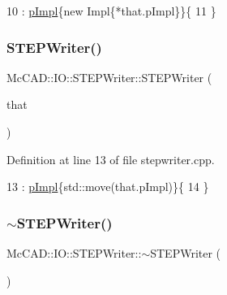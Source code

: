 \begin{DoxyCode}
10                                                     : \hyperlink{classMcCAD_1_1IO_1_1STEPWriter_af607286b2a18648c14ece6b8bc103db4}{pImpl}\{\textcolor{keyword}{new} Impl\{*that.pImpl\}\}\{
11 \}
\end{DoxyCode}
\mbox{\label{classMcCAD_1_1IO_1_1STEPWriter_a4afb3cf439afc5dced54779ccf323520}} 
\subsubsection{\texorpdfstring{S\+T\+E\+P\+Writer()}{STEPWriter()}\hspace{0.1cm}{\footnotesize\ttfamily [3/6]}}
{\footnotesize\ttfamily Mc\+C\+A\+D\+::\+I\+O\+::\+S\+T\+E\+P\+Writer\+::\+S\+T\+E\+P\+Writer (\begin{DoxyParamCaption}\item[{\hyperlink{classMcCAD_1_1IO_1_1STEPWriter}{S\+T\+E\+P\+Writer} \&\&}]{that }\end{DoxyParamCaption})}



Definition at line 13 of file stepwriter.\+cpp.


\begin{DoxyCode}
13                                                : \hyperlink{classMcCAD_1_1IO_1_1STEPWriter_af607286b2a18648c14ece6b8bc103db4}{pImpl}\{std::move(that.pImpl)\}\{
14 \}
\end{DoxyCode}
\mbox{\label{classMcCAD_1_1IO_1_1STEPWriter_a50066bad641148a65641ddb4ac21c07d}} 
\subsubsection{\texorpdfstring{$\sim$\+S\+T\+E\+P\+Writer()}{~STEPWriter()}\hspace{0.1cm}{\footnotesize\ttfamily [1/2]}}
{\footnotesize\ttfamily Mc\+C\+A\+D\+::\+I\+O\+::\+S\+T\+E\+P\+Writer\+::$\sim$\+S\+T\+E\+P\+Writer (\begin{DoxyParamCaption}{ }\end{DoxyParamCaption})}



